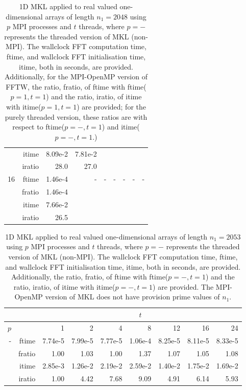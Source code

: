 \documentclass[a4]{article}
\begin{document}
\begin{table}
\begin{center}
\begin{tabular}{|r|r|r|r|r|r|r|r|r|}
      & itime &    8.09e-2 &   7.81e-2 &        & & & & \\
      & iratio &    28.0 &   27.0 &       & & & & \\ \hline
    16 & ftime  & 1.46e-4 &        - & - & - & - & - & - \\ 
     & fratio &  1.46e-4 &        &  &  &  &  &  \\
      & itime &    7.66e-2 &      & & & & & \\
      & iratio &     26.5 &     & & & & & \\ \hline
\end{tabular}
\caption{1D MKL applied to real valued one-dimensional arrays of length $n_1=2048$ using $p$ MPI processes and $t$ threads, where $p=-$ represents the threaded version of MKL (non-MPI). The wallclock FFT computation time, ftime, and wallclock FFT initialisation time, itime, both in seconds, are provided. Additionally, for the MPI-OpenMP version of FFTW, the ratio, fratio, of ftime  with ftime($p=1,t=1$) and the ratio, iratio, of itime  with itime($p=1,t=1$) are provided; for the purely threaded version, these ratios are with respect to ftime($p=-,t=1$) and itime($p=-,t=1$.) }\label{Tbl:MKL1d2048}
\end{center}
\end{table}

\begin{table}
\begin{center}
\begin{tabular}{|r|r|r|r|r|r|r|r|r|}
\hline 
     &  & \multicolumn{7}{c|}{$t$} \\ \hline
    $p$  &  & 1           & 2    & 4    & 8    & 12   & 16    & 24  \\ \hline\hline
    -  & ftime &  7.74e-5 &   7.99e-5 &   7.77e-5 &   1.06e-4 &  8.25e-5 &   8.11e-5 &   8.33e-5    \\ 
      & fratio & 1.00 &   1.03 &   1.00 &   1.37 &   1.07 &   1.05 &   1.08     \\ 
     & itime &    2.85e-3 &   1.26e-2 &   2.19e-2 &   2.59e-2 &   1.40e-2 &   1.75e-2 &   1.69e-2     \\ 
     & iratio &   1.00 &   4.42 &   7.68 &   9.09 &   4.91 &   6.14 &   5.93    \\ \hline
\end{tabular}
\caption{1D MKL applied to real valued one-dimensional arrays of length $n_1=2053$ using $p$ MPI processes and $t$ threads, where $p=-$ represents the threaded version of MKL (non-MPI). The wallclock FFT computation time, ftime, and wallclock FFT initialisation time, itime, both in seconds, are provided. Additionally, the ratio, fratio, of ftime  with ftime($p=-,t=1$) and the ratio, iratio, of itime  with itime($p=-,t=1$) are provided. The MPI-OpenMP version of MKL does not have provision prime values of $n_1.$  }\label{Tbl:MKL1d2053}
\end{center}
\end{table}
\end{document}
